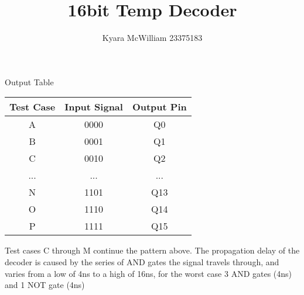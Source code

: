 \documentclass{article}
\title{16bit Temp Decoder}
\author{Kyara McWilliam 23375183}
\date{}
\begin{document}
\maketitle

Output Table
\hfill \break

\begin{tabular}{ |c|c|c| }
\hline
Test Case & Input Signal & Output Pin \\
\hline
A & 0000 & Q0 \\
B & 0001 & Q1 \\
C & 0010 & Q2 \\ 
... & ... & ...\\
N & 1101 & Q13 \\
O & 1110 & Q14 \\
P & 1111 & Q15 \\
\hline
\end{tabular}

\hfill \break

Test cases C through M continue the pattern above. The propagation delay of the decoder is caused by the series of AND gates the signal travels through, and varies from a low of 4ns to a high of 16ns, for the worst case 3 AND gates (4ns) and 1 NOT gate (4ns) 
\end{document}
